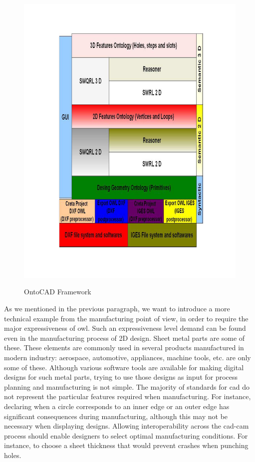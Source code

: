 \begin{figure}
\begin{center}
	\includegraphics[scale=0.8]{figure-chapterIV/fig4-33}\\
	\vspace{-40mm}
	\caption{OntoCAD Framework}
	\label{figure4-33}
\end{center}
\end{figure}

As we mentioned in the previous paragraph, we want to introduce a more technical example from the manufacturing point of view, in order to require the major expressiveness of \gls{owl}. Such an expressiveness level demand can be found even in the manufacturing process of 2D design. Sheet   metal parts are some of these. These elements are commonly used in several products manufactured in modern industry: aerospace, automotive, appliances, machine tools, etc. are only some of these. Although various software tools are available for making digital designs for such metal parts, trying to use those designs as input for process planning and manufacturing is not simple.  The majority of standards for \gls{cad} do not represent the particular features required when manufacturing. For instance, declaring when a circle corresponds to an inner edge or an outer edge has significant consequences during manufacturing, although this may not be necessary when displaying designs. Allowing interoperability across the \gls{cad}-\gls{cam} process should enable designers to select optimal manufacturing conditions. For instance, to choose a sheet thickness that would prevent crashes when punching holes.



